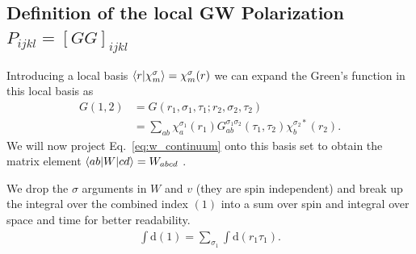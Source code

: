 \documentclass[12pt,a4paper]{scrartcl}
\numberwithin{equation}{section}
\begin{document}
\subsection{Definition of the local GW Polarization $P_{ijkl}=[GG]_{ijkl}$}

Introducing a local basis 
$\braket{r|\chi_{m}^{\sigma}}=\chi_{m}^{\sigma}(r)$ we can
expand the Green's function in this local basis as
\begin{align}
G(1,2) &=  G(r_1,\sigma_1,\tau_1;r_2,\sigma_2,\tau_2) \\
 &= \sum_{ab} \chi_{a}^{\sigma_1}(r_1) G^{\sigma_1\sigma_2}_{ab}(\tau_1,\tau_2)\chi_{b}^{\sigma_2*}(r_2). 
\end{align}
We will now project Eq.~\eqref{eq:w_continuum} onto this basis set to obtain the
matrix element $\braket{ab|W|cd} = W_{abcd}$ .

We drop the $\sigma$ arguments in $W$ and $v$ (they are spin independent) 
and break up the integral over the combined index $(1)$ into a sum over spin and integral over space and 
time for better readability.
\begin{align}
 \int \mathrm{d}(1) = \sum_{\sigma_1} \int\mathrm{d}(r_1\tau_1) .
\end{align}
\end{document}
